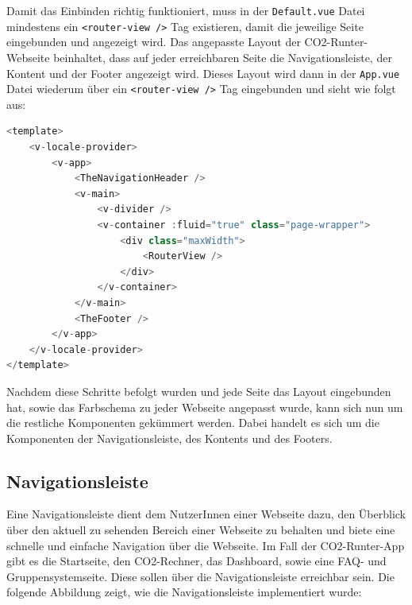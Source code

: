 Damit das Einbinden richtig funktioniert, muss in der \texttt{Default.vue} Datei mindestens ein \texttt{<router-view />} Tag existieren, damit die jeweilige Seite eingebunden und angezeigt wird.
Das angepasste Layout der CO2-Runter-Webseite beinhaltet, dass auf jeder erreichbaren Seite die Navigationsleiste, der Kontent und der Footer angezeigt wird.
Dieses Layout wird dann in der \texttt{App.vue} Datei wiederum über ein \texttt{<router-view />} Tag eingebunden und sieht wie folgt aus:

\begin{lstlisting}[language={JavaScript}, caption={Layout Definition}]
<template>
    <v-locale-provider>
        <v-app>
            <TheNavigationHeader />
            <v-main>
                <v-divider />
                <v-container :fluid="true" class="page-wrapper">
                    <div class="maxWidth">
                        <RouterView />
                    </div>
                </v-container>
            </v-main>
            <TheFooter />
        </v-app>
    </v-locale-provider>
</template>
\end{lstlisting}

Nachdem diese Schritte befolgt wurden und jede Seite das Layout eingebunden hat, sowie das Farbschema zu jeder Webseite angepasst wurde, kann sich nun um die restliche Komponenten gekümmert werden.
Dabei handelt es sich um die Komponenten der Navigationsleiste, des Kontents und des Footers.

\subsection{Navigationsleiste}

Eine Navigationsleiste dient dem NutzerInnen einer Webseite dazu, den Überblick über den aktuell zu sehenden Bereich einer Webseite zu behalten und biete eine schnelle und einfache Navigation über die Webseite.
Im Fall der CO2-Runter-App gibt es die Startseite, den CO2-Rechner, das Dashboard, sowie eine FAQ- und Gruppensystemseite.
Diese sollen über die Navigationsleiste erreichbar sein.
Die folgende Abbildung zeigt, wie die Navigationsleiste implementiert wurde:

